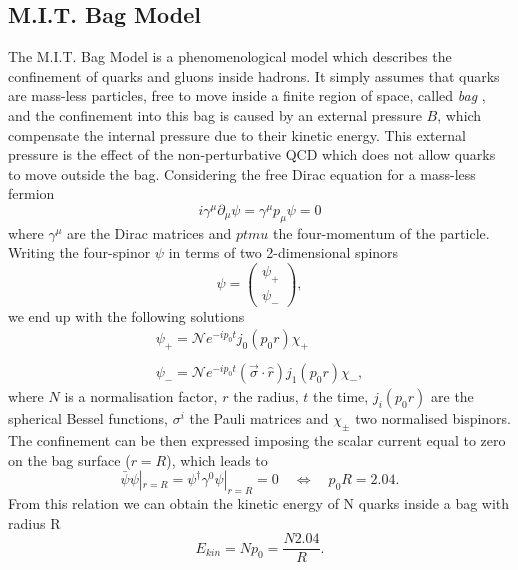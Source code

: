 \documentclass[b5paper,10pt,twoside,oldstyle,classica]{toptesi}
\begin{document}
\subsection{M.I.T. Bag Model}
The M.I.T. Bag Model \cite{Johnson:1975zp} is a phenomenological model which describes the confinement of quarks and gluons inside hadrons. It simply assumes that quarks are mass-less particles, free to move inside a finite region of space, called \textit{bag} \cite{Chodos:1974je}, and the confinement into this bag is caused by an external pressure $B$, which compensate the internal pressure due to their kinetic energy. This external pressure is the effect of the non-perturbative QCD which does not allow quarks to move outside the bag.
Considering the free Dirac equation for a mass-less fermion
\begin{equation}
 i\gamma^{\mu}\partial_{\mu}\psi = \gamma^{\mu}p_{\mu}\psi = 0
\end{equation}
where $\gamma^\mu$ are the Dirac matrices and $ ptmu$ the four-momentum of the particle.
Writing the four-spinor $\psi$ in terms of two 2-dimensional spinors 
\begin{equation}
 \psi = \left(
 \begin{array}{c}
  \psi_+\\
  \psi_-
 \end{array}
 \right),
\end{equation}
we end up with the following solutions
\begin{equation}
\begin{array}{c}
 \psi_+ = \mathcal{N}e^{-ip_0t}j_0(p_0r)\chi_+\\\\
 \psi_- = \mathcal{N}e^{-ip_0t}(\vec{\sigma}\cdot\hat{r})j_1(p_0r)\chi_-,
\end{array}
 \end{equation}
where $N$ is a normalisation factor, $r$ the radius, $t$ the time, $j_i(p_0r)$ are the spherical Bessel functions, $\sigma^i$ the Pauli matrices and $\chi_\pm$ two normalised bispinors.
The confinement can be then expressed imposing the scalar current equal to zero on the bag surface ($r=R$), which leads to
\begin{equation}
 \bar{\psi}\psi|_{r=R} = \psi^{\dagger}\gamma^0\psi|_{r=R} = 0 \quad \Leftrightarrow \quad p_0R = 2.04.
\end{equation}
From this relation we can obtain the kinetic energy of N quarks inside a bag with radius R
\begin{equation}
E_{kin} = Np_0 = \frac{N2.04}{R}. 
\end{equation}
\end{document}
